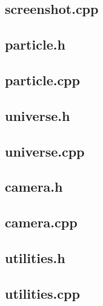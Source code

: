 \documentclass[10pt,a4paper]{article}
\begin{document}
\subsection{screenshot.cpp}

\clearpage
\subsection{particle.h}

\subsection{particle.cpp}

\clearpage
\subsection{universe.h}

\subsection{universe.cpp}

\clearpage
\subsection{camera.h}

\subsection{camera.cpp}

\clearpage
\subsection{utilities.h}

\subsection{utilities.cpp}

\end{document}
